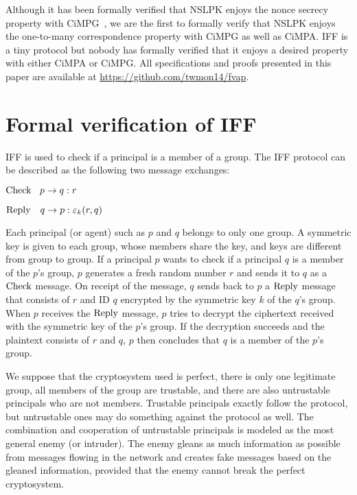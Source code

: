 \documentclass[10pt, conference, compsocconf]{IEEEtran}
\begin{document}
	Although it has been formally verified that NSLPK enjoys the nonce secrecy property with CiMPG~\cite{RiescoO18tosem}, we are the first to formally verify that NSLPK enjoys the one-to-many correspondence property with CiMPG as well as CiMPA. IFF is a tiny protocol but nobody has formally verified that it enjoys a desired property with either CiMPA or CiMPG. 
	All specifications and proofs presented in this paper are available at \url{https://github.com/twmon14/fvap}.
	
	\section{Formal verification of IFF}
	\label{sect_iff}
	IFF \cite{iff2001} is used to check if a principal is a member of a group. The IFF protocol can be described as the following two message exchanges:
	
	${\rm Check} \ \ \: p \rightarrow q : r$
	
	${\rm Reply}  \ \ \ q \rightarrow p : \varepsilon_k(r,q)$
	
	\noindent
	Each principal (or agent) such as $p$ and $q$ belongs to only one group.
	A symmetric key is given to each group, whose members share the key, and keys are different from group to group. If a principal $p$ wants to check if a principal $q$ is a member of the $p$'s group, $p$ generates a fresh random number $r$ and sends it to $q$ as a $\rm Check$ message. 
	On receipt of the message, $q$ sends back to $p$ a $\rm Reply$ message that consists of $r$ and ID $q$ encrypted by the symmetric key $k$ of the $q$'s group. 
	When $p$ receives the $\rm Reply$ message, $p$ tries to decrypt the ciphertext received with the symmetric key of the $p$'s group. 
	If the decryption succeeds and the plaintext consists of $r$ and $q$, $p$ then concludes that $q$ is a member of the $p$'s group. 
	
	We suppose that the cryptosystem used is perfect, there is only one legitimate group, all members of the group are trustable, and there are also untrustable principals who are not members. Trustable principals exactly follow the protocol, but untrustable ones may do something against the protocol as well. The combination and cooperation of untrustable principals is modeled as the most general enemy (or intruder). The enemy gleans as much information as possible from messages flowing in the network and creates fake messages based on the gleaned information, provided that the enemy cannot break the perfect cryptosystem.
	
\end{document}
